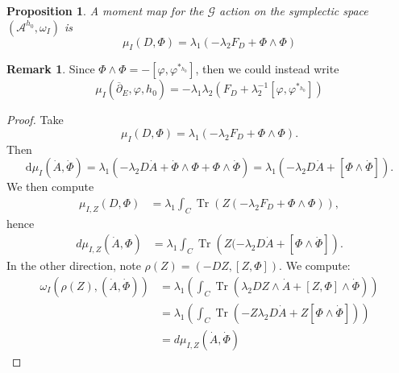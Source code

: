 \documentclass[12pt,letterpaper,reqno]{amsart}
\newtheorem{prop}[thm]{Proposition}
\theoremstyle{remark}
\theoremstyle{definition}
\newtheorem{rem}[thm]{Remark}
\numberwithin{thm}{section}
\numberwithin{equation}{section}
\numberwithin{figure}{section}
\newcommand{\delbar}{\ensuremath{\overline{\partial}}}
\newcommand{\de}{\mathrm{d}}
\DeclareMathOperator{\Tr}{Tr}
\begin{document}
\begin{prop}
A moment map for the $\mathcal{G}$ action on the symplectic space $(\mathcal{A}^{h_0}, \omega_I)$ is 
\[ \mu_{I}(D, \Phi) = \lambda_1 \left(-\lambda_2F_D + \Phi \wedge \Phi \right)\]
\end{prop}
\begin{rem}
Since $\Phi \wedge \Phi = - [\varphi, \varphi^{*_{h_0}}]$, then we could instead write
\[ \mu_I(\delbar_E, \varphi, h_0) = -\lambda_1  \lambda_2 \left(F_D + \lambda_2^{-1} [\varphi, \varphi^{*_{h_0}}]\right) \]
\end{rem}
\begin{proof}
Take $$\mu_{I}(D, \Phi) = \lambda_1 \left(-\lambda_2F_D + \Phi \wedge \Phi \right).$$
Then $$\de \mu_{I}(\dot{A}, \dot{\Phi}) =  \lambda_1 \left(- \lambda_2D \dot{A} + \dot{\Phi} \wedge \Phi + \Phi \wedge \dot{\Phi} \right)=\lambda_1 \left(-\lambda_2 D \dot{A} + [\Phi \wedge \dot{\Phi}]\right).$$
We then compute
\begin{align*}
\mu_{I, Z}(D, \Phi) &= \lambda_1\int_C \Tr\left(Z(-\lambda_2F_D + \Phi \wedge \Phi)\right),
\end{align*}
hence 
\begin{align*}
d\mu_{I, Z}(\dot{A}, \Phi) &= \lambda_1 \int_C \Tr \left(Z (-\lambda_2 D \dot{A} + [\Phi \wedge \dot{\Phi}] \right).
\end{align*}
In the other direction, note  $\rho(Z)=(-D Z, [Z, \Phi])$. We compute:
\begin{align*}
\omega_I(\rho(Z), (\dot{A}, \dot{\Phi})) &=  \lambda_1  \left(\int_C \Tr \left(\lambda_2 DZ  \wedge \dot{A} + [Z, \Phi] \wedge  \dot\Phi \right) \right)\\
&=  \lambda_1  \left(\int_C \Tr \left( -Z \lambda_2 D \dot{A} + Z[ \Phi \wedge  \dot\Phi]\right) \right)\\
&=d \mu_{I, Z}(\dot{A}, \dot{\Phi})
\end{align*}
\end{proof}
\end{document}
